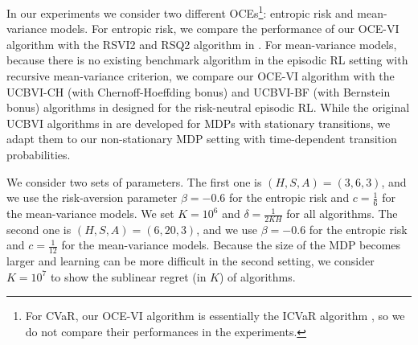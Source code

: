 \documentclass[11pt]{article}
\newcommand{\1}{\mathbbm{1}}
\begin{document}

In our experiments we consider two different OCEs\footnote{For CVaR, our OCE-VI algorithm is essentially the ICVaR algorithm \cite{du2022risk}, so we do not compare their performances in the experiments.
}: entropic risk and mean-variance models. For entropic risk, we compare the performance of our OCE-VI algorithm with the RSVI2 and RSQ2 algorithm in \cite{fei2021exponential}. For mean-variance models, because there is no existing benchmark algorithm in the episodic RL setting with recursive mean-variance criterion, we compare our OCE-VI algorithm with the UCBVI-CH (with Chernoff-Hoeffding bonus)
and UCBVI-BF (with Bernstein bonus) algorithms in \cite{azar2017minimax} designed for the risk-neutral episodic RL. While the original UCBVI algorithms in \cite{azar2017minimax} are developed for MDPs with stationary transitions, we adapt them to our non-stationary MDP setting with time-dependent transition probabilities. 


We consider two sets of parameters. The first one is $(H,S,A)=(3,6,3)$, and  we use the risk-aversion parameter $\beta=-0.6$ for the entropic risk and $c=\frac{1}{6}$ for the mean-variance models. We set
$K=10^6$ and $\delta=\frac{1}{2KH}$ for all algorithms. The second one is $(H,S,A)=(6,20,3)$, and  we use $\beta=-0.6$ for the entropic risk and $c=\frac{1}{12}$ for the mean-variance models. Because the size of the MDP becomes larger and learning can be more difficult in the second setting, we consider $K=10^7$ to show the sublinear regret (in $K$) of algorithms. 

\end{document}
